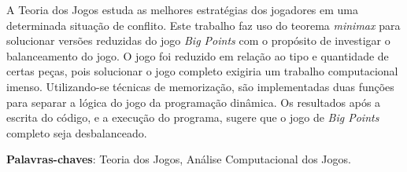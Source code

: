 \begin{resumo}

A Teoria dos Jogos estuda as melhores estratégias dos jogadores em uma determinada situação de conflito.
Este trabalho faz uso do teorema \emph{minimax} para solucionar versões reduzidas do jogo \emph{Big Points} com o propósito de investigar o balanceamento do jogo.
O jogo foi reduzido em relação ao tipo e quantidade de certas peças, pois solucionar o jogo completo exigiria um trabalho computacional imenso.
Utilizando-se técnicas de memorização, são implementadas duas funções para separar a lógica do jogo da programação dinâmica.
Os resultados após a escrita do código, e a execução do programa, sugere que o jogo de \emph{Big Points} completo seja desbalanceado.

 \vspace{\onelineskip}

 \noindent
 \textbf{Palavras-chaves}: Teoria dos Jogos, Análise Computacional dos Jogos.
\end{resumo}

